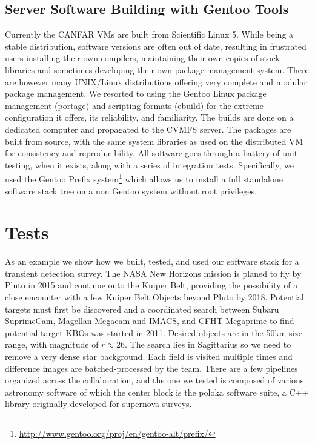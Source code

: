 \subsection{Server Software Building with Gentoo Tools}
Currently the CANFAR VMs are built from
Scientific Linux 5. While being a stable distribution, software versions
are often out of date, resulting in frustrated users installing their own
compilers, maintaining their own copies of stock libraries and
sometimes developing their own package management system. There are however many UNIX/Linux distributions offering
very complete and modular package management. We resorted to
using the Gentoo Linux package management (portage) and scripting formats
(ebuild) for the extreme configuration it offers, its reliability, and
familiarity. The builds are done on a dedicated computer and propagated to the CVMFS
server. The packages are built from source, with the same system libraries as used on the
distributed VM for consistency and reproducibility. All software
goes through a battery of unit testing, when it exists, along with a series
of integration tests. Specifically, we used the Gentoo Prefix system\footnote{\url{http://www.gentoo.org/proj/en/gentoo-alt/prefix/}}
which allows us to install a full standalone software stack tree on a non
Gentoo system without root privileges.

\section{Tests}

As an example we show how we built, tested, and used our software stack
for a transient detection survey.
The NASA New Horizons mission is planed to fly by Pluto in 2015 and
continue onto the Kuiper Belt, providing the possibility of a close
encounter with a few Kuiper Belt Objects beyond Pluto by
2018. Potential targets must first be discovered and a coordinated
search between Subaru SuprimeCam, Magellan Megacam and IMACS, and CFHT
Megaprime to find potential target KBOs was started in 2011. Desired objects
are in the 50km size range, with magnitude of $r\approx 26$. The search lies in
Sagittarius so we need to remove a very dense star background. Each
field is visited multiple times and difference images are
batched-processed by the team. There are a few
pipelines organized across the collaboration, and the one we tested is
composed of various astronomy software of which the center block is the poloka software suite, a C++
library originally developed for supernova surveys.

